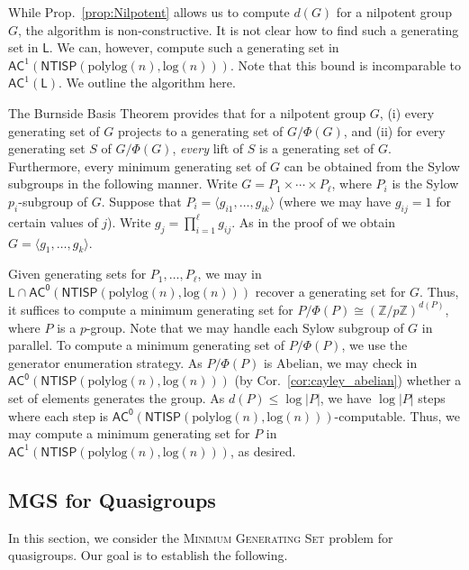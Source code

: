 \documentclass{article}
\newcommand{\algprobm}[1]{\textsc{#1}\xspace}
\newcommand{\Cor}[1]{Cor.~\ref{#1}\xspace}
\newcommand{\Prop}[1]{Prop.~\ref{#1}\xspace}
\newcommand*{\ComplexityClass}[1]{\ensuremath{\mathsf{#1}}\xspace}
\newcommand{\NTISP}{\ComplexityClass{NTISP}}
\newcommand{\NTISPpll}{\ensuremath{\NTISP(\mathrm{polylog}(n),\mathrm{log}(n))}\xspace}
\newcommand*{\LogSpace}{\ComplexityClass{L}}
\newcommand{\AC}{\ComplexityClass{AC}}
\newcommand{\ACz}{\ComplexityClass{AC^0}}
\begin{document}
\begin{remark}
While \Prop{prop:Nilpotent} allows us to compute $d(G)$ for a nilpotent group $G$, the algorithm is non-constructive. It is not clear how to find such a generating set in $\LogSpace$. We can, however, compute such a generating set in  $\AC^{1}(\NTISPpll)$. Note that this bound is incomparable to $\AC^{1}(\LogSpace)$. We outline the algorithm here. 

The Burnside Basis Theorem provides that for a nilpotent group $G$, (i) every generating set of $G$ projects to a generating set of $G/\Phi(G)$, and (ii) for every generating set $S$ of $G/\Phi(G)$, \emph{every} lift of $S$ is a generating set of $G$. Furthermore, every minimum generating set of $G$ can be obtained from the Sylow subgroups in the following manner. Write $G = P_{1} \times \cdots \times P_{\ell}$, where $P_{i}$ is the Sylow $p_{i}$-subgroup of $G$. Suppose that $P_{i} = \langle g_{i1}, \ldots, g_{ik}\rangle$ (where we may have $g_{ij} = 1$ for certain values of $j$). Write $g_{j} = \prod_{i=1}^{\ell} g_{ij}$. As in the proof of \cite[Theorem~7]{ArvindToran} we obtain $G = \langle g_{1}, \ldots, g_{k} \rangle.$

Given generating sets for $P_{1}, \ldots, P_{\ell}$, we may in $\LogSpace \cap \ACz(\NTISPpll)$ recover a generating set for $G$. Thus, it suffices to compute a minimum generating set for $P/\Phi(P) \cong (\mathbb{Z}/p\mathbb{Z})^{d(P)}$, where $P$ is a $p$-group.  Note that we may handle each Sylow subgroup of $G$ in parallel. To compute a minimum generating set of $P/\Phi(P)$, we use the generator enumeration strategy. As $P/\Phi(P)$ is Abelian, we may check in $\ACz(\NTISPpll)$ (by \Cor{cor:cayley_abelian}) whether a set of elements generates the group. As $d(P) \leq \log |P|$, we have $\log |P|$ steps where each step is $\ACz(\NTISPpll)$-computable. Thus, we may compute a minimum generating set for $P$ in $\AC^{1}(\NTISPpll)$, as desired. 
\end{remark}





\iffalse
\subsection{\algprobm{MGS} for Quasigroups}
In this section, we consider the \algprobm{Minimum Generating Set} problem for quasigroups. Our goal is to establish the following.
\end{document}

